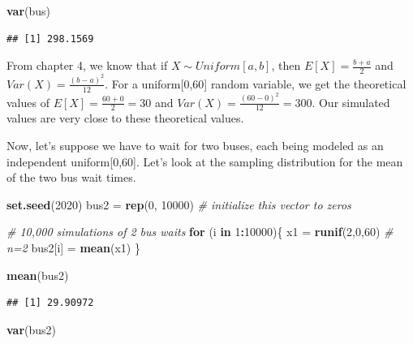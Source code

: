 \documentclass[
  11pt,
  oneside]{book}
\newenvironment{Shaded}{\begin{snugshade}}{\end{snugshade}}
\newcommand{\CommentTok}[1]{\textcolor[rgb]{0.56,0.35,0.01}{\textit{#1}}}
\newcommand{\ControlFlowTok}[1]{\textcolor[rgb]{0.13,0.29,0.53}{\textbf{#1}}}
\newcommand{\DecValTok}[1]{\textcolor[rgb]{0.00,0.00,0.81}{#1}}
\newcommand{\FunctionTok}[1]{\textcolor[rgb]{0.13,0.29,0.53}{\textbf{#1}}}
\newcommand{\NormalTok}[1]{#1}
\newcommand{\OtherTok}[1]{\textcolor[rgb]{0.56,0.35,0.01}{#1}}
\newcommand{\SpecialCharTok}[1]{\textcolor[rgb]{0.81,0.36,0.00}{\textbf{#1}}}
\theoremstyle{definition}
\theoremstyle{definition}
\theoremstyle{definition}
\theoremstyle{definition}
\theoremstyle{remark}
\begin{document}
\begin{Shaded}
\begin{Highlighting}[]
\FunctionTok{var}\NormalTok{(bus)}
\end{Highlighting}
\end{Shaded}

\begin{verbatim}
## [1] 298.1569
\end{verbatim}

From chapter 4, we know that if \(X \sim Uniform[a,b]\), then \(E[X] = \frac{b+a}{2}\) and \(Var(X) = \frac{(b-a)^2}{12}\). For a uniform{[}0,60{]} random variable, we get the theoretical values of \(E[X] = \frac{60+0}{2}=30\) and \(Var(X)=\frac{(60-0)^2}{12}=300\). Our simulated values are very close to these theoretical values.

\newpage

Now, let's suppose we have to wait for two buses, each being modeled as an independent uniform{[}0,60{]}. Let's look at the sampling distribution for the mean of the two bus wait times.

\begin{Shaded}
\begin{Highlighting}[]
\FunctionTok{set.seed}\NormalTok{(}\DecValTok{2020}\NormalTok{)}
\NormalTok{bus2 }\OtherTok{=} \FunctionTok{rep}\NormalTok{(}\DecValTok{0}\NormalTok{, }\DecValTok{10000}\NormalTok{) }\CommentTok{\# initialize this vector to zeros}

\CommentTok{\# 10,000 simulations of 2 bus waits}
\ControlFlowTok{for}\NormalTok{ (i }\ControlFlowTok{in} \DecValTok{1}\SpecialCharTok{:}\DecValTok{10000}\NormalTok{)\{}
\NormalTok{x1 }\OtherTok{=} \FunctionTok{runif}\NormalTok{(}\DecValTok{2}\NormalTok{,}\DecValTok{0}\NormalTok{,}\DecValTok{60}\NormalTok{) }\CommentTok{\# n=2}
\NormalTok{bus2[i] }\OtherTok{=} \FunctionTok{mean}\NormalTok{(x1)}
\NormalTok{\}}

\FunctionTok{mean}\NormalTok{(bus2)}
\end{Highlighting}
\end{Shaded}

\begin{verbatim}
## [1] 29.90972
\end{verbatim}

\begin{Shaded}
\begin{Highlighting}[]
\FunctionTok{var}\NormalTok{(bus2)}
\end{Highlighting}
\end{Shaded}
\end{document}
